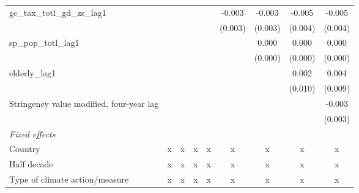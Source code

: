 \begin{tabular}{lcccccccc}
   gc\_tax\_totl\_gd\_zs\_lag1                                                     &              &              &              &              & -0.003       & -0.003       & -0.005  & -0.005\\   
                                                                                   &              &              &              &              & (0.003)      & (0.003)      & (0.004) & (0.004)\\   
   sp\_pop\_totl\_lag1                                                             &              &              &              &              &              & 0.000        & 0.000   & 0.000\\   
                                                                                   &              &              &              &              &              & (0.000)      & (0.000) & (0.000)\\   
   elderly\_lag1                                                                   &              &              &              &              &              &              & 0.002   & 0.004\\   
                                                                                   &              &              &              &              &              &              & (0.010) & (0.009)\\   
   Stringency value modified, four-year lag                                        &              &              &              &              &              &              &         & -0.003\\   
                                                                                   &              &              &              &              &              &              &         & (0.003)\\   
   \emph{Fixed effects}\\
   Country                                                                         & x            & x            & x            & x            & x            & x            & x       & x\\  
   Half decade                                                                     & x            & x            & x            & x            & x            & x            & x       & x\\  
   Type of climate action/measure                                                  & x            & x            & x            & x            & x            & x            & x       & x\\  

\end{tabular}
